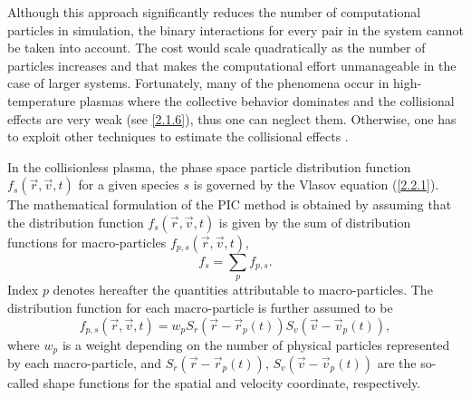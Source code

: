 Although this approach significantly reduces the number of computational particles in simulation, the binary interactions for every pair in the system cannot be taken into account. The cost would scale quadratically as the number of particles increases and that makes the computational effort unmanageable in the case of larger systems. Fortunately, many of the phenomena occur in high-temperature plasmas where the collective behavior dominates and the collisional effects are very weak (see \ref{2.1.6}), thus one can neglect them. Otherwise, one has to exploit other techniques to estimate the collisional effects \cite{lapenta}.

In the collisionless plasma, the phase space particle distribution function  $ f_{s} \left(\vec{r}, \vec{v}, t\right) $ for a given species $ s $ is governed by the Vlasov equation (\ref{2.2.1}). The mathematical formulation of the PIC method is obtained by assuming that the distribution function $ f_{s} \left(\vec{r}, \vec{v}, t\right) $ is given by the sum of distribution functions for macro-particles $ f_{p, s} \left(\vec{r}, \vec{v}, t\right) $,
\begin{equation}
\label{3.1.1}
f_{s} =  \sum_{p} f_{p, s}.
\end{equation}
Index $ p $ denotes hereafter the quantities attributable to macro-particles. The distribution function for each macro-particle is further assumed to be
\begin{equation}
\label{3.1.2}
f_{p, s}\left(\vec{r}, \vec{v}, t \right) = w_{p} S_{r}\left(\vec{r} - \vec{r}_{p}\left(t\right) \right)  S_{v}\left(\vec{v} - \vec{v}_{p}\left( t\right) \right),
\end{equation}
where $ w_{p} $ is a weight depending on the number of physical particles represented by each macro-particle, and $ S_{r}\left(\vec{r} - \vec{r}_{p}\left(t\right) \right) $, $ S_{v}\left(\vec{v} - \vec{v}_{p}\left(t\right) \right) $ are the so-called shape functions for the spatial and velocity coordinate, respectively.

